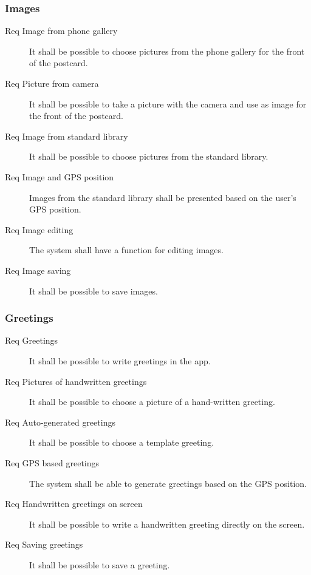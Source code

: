 \documentclass[10pt,a4paper]{article}
\begin{document}
\subsubsection{Images} 
\begin {description}
\item [Req  Image from phone gallery]It shall be possible to choose pictures from the phone gallery for the front of the postcard.
\item [Req  Picture from camera] It shall be possible to take a picture with the camera and use as image for the front of the postcard.
\item [Req  Image from standard library] It shall be possible to choose pictures from the standard library.
\item [Req  Image and GPS position] Images from the standard library shall be presented based on the user's GPS position.
\item [Req  Image editing] The system shall have a function for editing images.
\item [Req  Image saving] It shall be possible to save images.
\end{description}

\subsubsection{Greetings}
\begin{description}
	\item [Req  Greetings] It shall be possible to write greetings in the app.
	\item [Req  Pictures of handwritten greetings] It shall be possible to choose a picture of a hand-written greeting.
	\item [Req  Auto-generated greetings] It shall be possible to choose a template greeting.
	\item [Req  GPS based greetings] The system shall be able to generate greetings based on the GPS position.
	\item [Req  Handwritten greetings on screen] It shall be possible to write a handwritten greeting directly on the screen.
	\item [Req  Saving greetings] It shall be possible to save a greeting.
\end{description}
\end{document}
